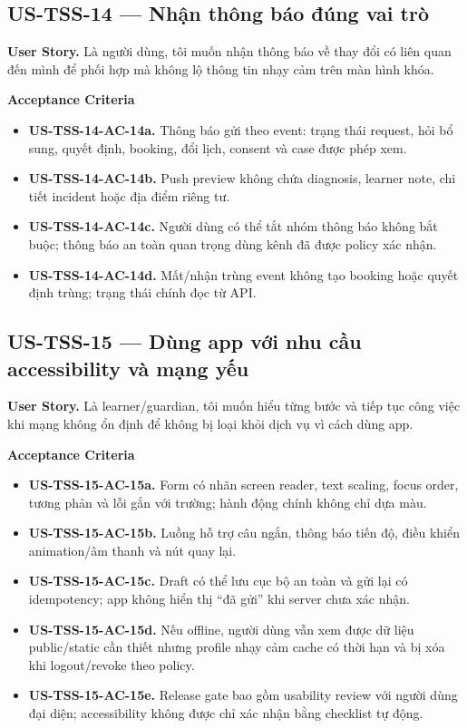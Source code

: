 \documentclass[11pt,a4paper]{article}
\newcommand{\ac}[1]{\textbf{\currentstory-AC-#1.}}
\newcommand{\storytitle}[2]{\subsection{#1 — #2}\def\currentstory{#1}}
\newcommand{\story}[1]{\textbf{User Story.} #1\par}
\newcommand{\acceptance}{\textbf{Acceptance Criteria}\par}
\begin{document}
\storytitle{US-TSS-14}{Nhận thông báo đúng vai trò}
\story{Là người dùng, tôi muốn nhận thông báo về thay đổi có liên quan đến mình để phối hợp mà không lộ thông tin nhạy cảm trên màn hình khóa.}
\acceptance
\begin{itemize}
  \item \ac{14a} Thông báo gửi theo event: trạng thái request, hỏi bổ sung, quyết định, booking, đổi lịch, consent và case được phép xem.
  \item \ac{14b} Push preview không chứa diagnosis, learner note, chi tiết incident hoặc địa điểm riêng tư.
  \item \ac{14c} Người dùng có thể tắt nhóm thông báo không bắt buộc; thông báo an toàn quan trọng dùng kênh đã được policy xác nhận.
  \item \ac{14d} Mất/nhận trùng event không tạo booking hoặc quyết định trùng; trạng thái chính đọc từ API.
\end{itemize}

\storytitle{US-TSS-15}{Dùng app với nhu cầu accessibility và mạng yếu}
\story{Là learner/guardian, tôi muốn hiểu từng bước và tiếp tục công việc khi mạng không ổn định để không bị loại khỏi dịch vụ vì cách dùng app.}
\acceptance
\begin{itemize}
  \item \ac{15a} Form có nhãn screen reader, text scaling, focus order, tương phản và lỗi gắn với trường; hành động chính không chỉ dựa màu.
  \item \ac{15b} Luồng hỗ trợ câu ngắn, thông báo tiến độ, điều khiển animation/âm thanh và nút quay lại.
  \item \ac{15c} Draft có thể lưu cục bộ an toàn và gửi lại có idempotency; app không hiển thị “đã gửi” khi server chưa xác nhận.
  \item \ac{15d} Nếu offline, người dùng vẫn xem được dữ liệu public/static cần thiết nhưng profile nhạy cảm cache có thời hạn và bị xóa khi logout/revoke theo policy.
  \item \ac{15e} Release gate bao gồm usability review với người dùng đại diện; accessibility không được chỉ xác nhận bằng checklist tự động.
\end{itemize}
\end{document}
